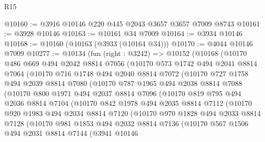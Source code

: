 \begin{lexlean}{R15}
\begin{coremodule}
@10160 := @3916 @10146 @220 @445 @2043 @3657 @3657 @7009 @8743
@10161 := @3928 @10146
@10163 := @10161 @34 @7009
@10164 := @3934 @10146
@10168 := @10160 (@10163 (@3933 (@10164 @34)))
@10170 := @4044 @10146 @7009
@10277 := @10134
    (fun (right : @3242) =>
    @10152
      (@10168
        (@10170
          @486
          @669
          @494
          @2042
          @8814
          @7056
          (@10170
            @573
            @1742
            @494
            @2041
            @8814
            @7064
            (@10170
              @716
              @1748
              @494
              @2040
              @8814
              @7072
              (@10170
                @727
                @1758
                @494
                @2039
                @8814
                @7080
                (@10170
                  @787
                  @1965
                  @494
                  @2038
                  @8814
                  @7088
                  (@10170
                    @800
                    @1971
                    @494
                    @2037
                    @8814
                    @7096
                    (@10170
                      @819
                      @795
                      @494
                      @2036
                      @8814
                      @7104
                      (@10170
                        @842
                        @1978
                        @494
                        @2035
                        @8814
                        @7112
                        (@10170
                          @920
                          @1983
                          @494
                          @2034
                          @8814
                          @7120
                          (@10170
                            @970
                            @1828
                            @494
                            @2033
                            @8814
                            @7128
                            (@10170
                              @981
                              @1853
                              @494
                              @2032
                              @8814
                              @7136
                              (@10170
                                @567
                                @1506
                                @494
                                @2031
                                @8814
                                @7144
                                (@3941
                                  @10146

\end{coremodule}
\end{lexlean}
